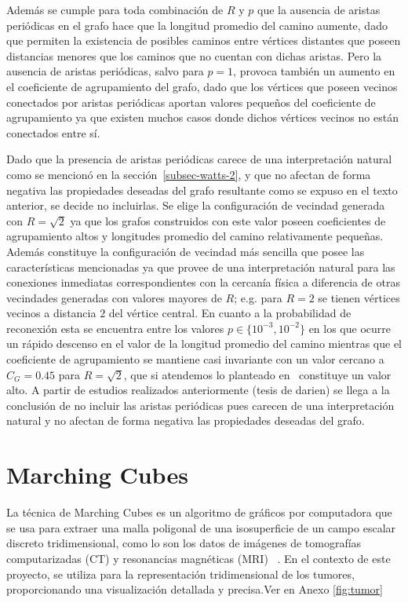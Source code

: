 Adem\'as se cumple para toda combinaci\'on de $R$ y $p$ que la ausencia de aristas peri\'odicas en el grafo hace que la longitud promedio del camino aumente, dado que permiten la existencia de posibles caminos entre v\'ertices distantes que poseen distancias menores que los caminos que no cuentan con dichas aristas. Pero la ausencia de aristas peri\'odicas, salvo para $p=1$, provoca tambi\'en un aumento en el coeficiente de agrupamiento del grafo, dado que los v\'ertices que poseen vecinos conectados por aristas peri\'odicas aportan valores peque\~nos del coeficiente de agrupamiento ya que existen muchos casos donde dichos v\'ertices vecinos no est\'an conectados entre s\'i.

Dado que la presencia de aristas peri\'odicas carece de una interpretaci\'on natural como se mencion\'o en la secci\'on~\ref{subsec-watts-2}, y que no afectan de forma negativa las propiedades deseadas del grafo resultante como se expuso en el texto anterior, se decide no incluirlas. Se elige la configuraci\'on de vecindad generada con $R=\sqrt{2}$ ya que los grafos construidos con este valor poseen coeficientes de agrupamiento altos y longitudes promedio del camino relativamente peque\~nas. Adem\'as constituye la configuraci\'on de vecindad m\'as sencilla que posee las caracter\'isticas mencionadas ya que provee de una interpretaci\'on natural para las conexiones inmediatas correspondientes con la cercan\'ia f\'isica a diferencia de otras vecindades generadas con valores mayores de $R$; e.g. para $R=2$ se tienen v\'ertices vecinos a distancia $2$ del v\'ertice central. En cuanto a la probabilidad de reconexi\'on esta se encuentra entre los valores $p \in \lbrace 10^{-3}, 10^{-2} \rbrace$ en los que ocurre un r\'apido descenso en el valor de la longitud promedio del camino mientras que el coeficiente de agrupamiento se mantiene casi invariante con un valor cercano a $C_G=0$.$45$ para $R=\sqrt{2}$, que si atendemos lo planteado en~\cite{complexnetworks} constituye un valor alto.
A partir de estudios realizados anteriormente (tesis de darien) se llega a la conclusión de no incluir las aristas periódicas pues carecen de una interpretación natural y no afectan de forma negativa las propiedades deseadas del grafo. %

\section{Marching Cubes}

La técnica de Marching Cubes es un algoritmo de gráficos por computadora que se usa para extraer una malla poligonal de una isosuperficie de un campo escalar discreto tridimensional, como lo son los datos de imágenes de tomografías computarizadas (CT) y resonancias magnéticas (MRI) ~\cite{5}. En el contexto de este proyecto, se utiliza para la representación tridimensional de los tumores, proporcionando una visualización detallada y precisa.Ver en Anexo \ref{fig:tumor}

